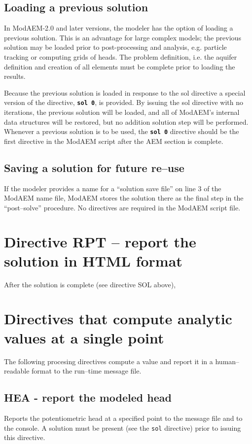 \subsection{Loading a previous solution}

In ModAEM-2.0 and later versions, the modeler has the option of loading a
previous solution. This is an advantage for large complex models; the previous
solution may be loaded prior to post-processing and analysis, e.g. particle
tracking or computing grids of heads. The problem definition, i.e.
the aquifer definition and creation of all elements must be complete
prior to loading the results. 

Because the previous solution is loaded in response to the \textsf{sol}
directive a special version of the directive, \texttt{\textbf{sol
0}}, is provided. By issuing the \textsf{sol} directive with no iterations,
the previous solution will be loaded, and all of ModAEM's internal
data structures will be restored, but no addition solution step will
be performed. Whenever a previous solution is to be used, the \texttt{\textbf{sol
0}} directive should be the first directive in the ModAEM script after
the AEM section is complete.

\subsection{Saving a solution for future re--use}

If the modeler provides a name for a ``solution save file'' on line
3 of the ModAEM name file, ModAEM stores the solution there as the
final step in the ``post--solve'' procedure. No directives are required
in the ModAEM script file.

\section{Directive RPT -- report the solution in HTML format}

After the solution is complete (see directive \textsf{SOL} above), 

\section{Directives that compute analytic values at a single point}

The following procesing directives compute a value and report it in
a human--readable format to the run--time message file.

\subsection{\label{HEA_directive}HEA - report the modeled head}
Reports the potentiometric head at a specified point to the message
file and to the console. A solution must be present (see the \texttt{sol}
directive) prior to issuing this directive. 


